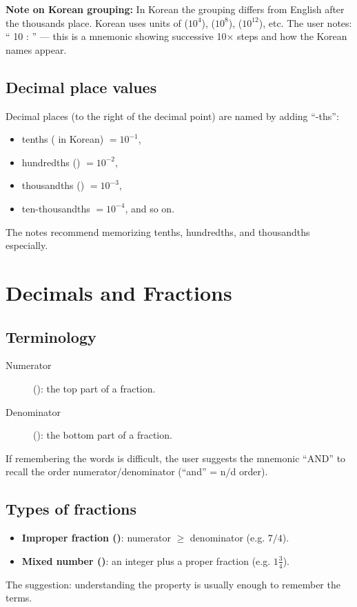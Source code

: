 \documentclass[12pt]{article}
\begin{document}
\textbf{Note on Korean grouping:} In Korean the grouping differs from English 
after the thousands place. Korean uses units of  ($10^{4}$),  ($10^{8}$),  ($10^{12}$), etc. The user notes: ``   10  :           '' — this is a mnemonic showing successive 10× steps and how the Korean names appear.

\subsection{Decimal place values}
Decimal places (to the right of the decimal point) are named by adding ``-ths'':
\begin{itemize}
  \item tenths (\emph{} in Korean) $= 10^{-1}$,
  \item hundredths (\emph{}) $= 10^{-2}$,
  \item thousandths (\emph{}) $= 10^{-3}$,
  \item ten-thousandths $= 10^{-4}$, and so on.
\end{itemize}

The notes recommend memorizing tenths, hundredths, and thousandths especially.

\section{Decimals and Fractions}
\subsection{Terminology}
\begin{description}
  \item[Numerator] (): the top part of a fraction.
  \item[Denominator] (): the bottom part of a fraction.
\end{description}

If remembering the words is difficult, the user suggests the mnemonic ``AND'' to recall the order numerator/denominator (``and'' = n/d order).

\subsection{Types of fractions}
\begin{itemize}
  \item \textbf{Improper fraction ()}: numerator $\ge$ denominator (e.g. $7/4$).
  \item \textbf{Mixed number ()}: an integer plus a proper fraction (e.g. $1\tfrac{3}{4}$).
\end{itemize}
The suggestion: understanding the property is usually enough to remember the terms.
\end{document}
